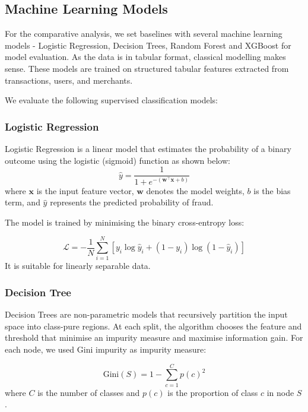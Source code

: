 \documentclass[conference]{IEEEtran}
\begin{document}
\subsection{Machine Learning Models}\label{AA}
For the comparative analysis, we set baselines with several machine learning models - Logistic Regression, Decision Trees, Random Forest and XGBoost for model evaluation. As the data is in tabular format, classical modelling makes sense. These models are trained on structured tabular features extracted from transactions, users, and merchants.

We evaluate the following supervised classification models:


\subsubsection{Logistic Regression}
Logistic Regression is a linear model that estimates the probability of a binary outcome using the logistic (sigmoid) function as shown below: 
\begin{equation}
    \hat{y} = \frac{1}{1 + e^{-(\mathbf{w}^\top \mathbf{x} + b)}}
    \label{eq:logistic}
\end{equation}
where $\mathbf{x}$ is the input feature vector, $\mathbf{w}$ denotes the model weights, $b$ is the bias term, and $\hat{y}$ represents the predicted probability of fraud.


The model is trained by minimising the binary cross-entropy loss:

\begin{equation}
    \mathcal{L} = -\frac{1}{N} \sum_{i=1}^{N} \left[y_i \log \hat{y}_i + (1 - y_i) \log(1 - \hat{y}_i)\right]
\end{equation}
 It is suitable for linearly separable data.


\subsubsection{Decision Tree}
Decision Trees are non-parametric models that recursively partition the input space into class-pure regions. At each split, the algorithm chooses the feature and threshold that minimise an impurity measure and maximise information gain. For each node, we used Gini impurity as impurity measure:

\begin{equation}
    \text{Gini}(S) = 1 - \sum_{c=1}^{C} p(c)^2
    \label{eq:gini}
\end{equation}
where $C$ is the number of classes and $p(c)$ is the proportion of class $c$ in node $S$.
\end{document}
